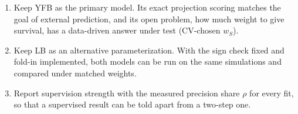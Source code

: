 \documentclass[11pt]{article}
\newcommand{\ws}{w_S}
\begin{document}
\begin{keybox}[Recommendation]
\begin{enumerate}
  \item Keep YFB as the primary model. Its exact projection scoring matches the
        goal of external prediction, and its open problem, how much weight to
        give survival, has a data-driven answer under test (CV-chosen $\ws$).
  \item Keep LB as an alternative parameterization. With the sign check fixed and
        fold-in implemented, both models can be run on
        the same simulations and compared under matched weights.
  \item Report supervision strength with the measured precision share $\rho$ for
        every fit, so that a supervised result can be told apart from a two-step
        one.
\end{enumerate}
\end{keybox}
\end{document}
